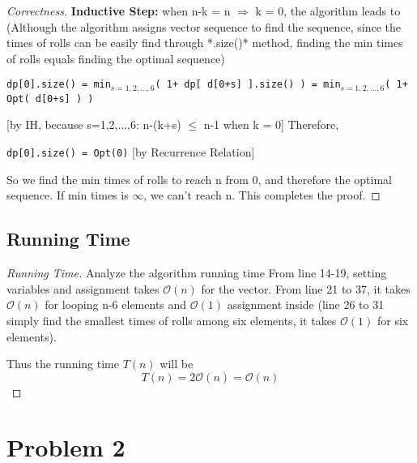 \documentclass[openany]{article}
\begin{document}
\begin{proof}[Correctness]{}
    \textbf{Inductive Step:} when n-k = n $\Rightarrow$ k = 0, the algorithm leads to (Although the algorithm assigns vector sequence to find the sequence, since the times of rolls can be easily find through *.size()* method, finding the min times of rolls equals finding the optimal sequence)
    \begin{center}
        \texttt{dp[0].size() = min$_{s=1,2,...,6}$( 1+ dp[ d[0+s] ].size() ) = min$_{s=1,2,...,6}$( 1+ Opt( d[0+s] ) )}
    \end{center}
    [by IH, because s=1,2,...,6: n-(k+s) $\leq$ n-1 when k = 0]
    Therefore,
    \begin{center}
        \texttt{dp[0].size() = Opt(0)} [by Recurrence Relation]
    \end{center}
    
    So we find the min times of rolls to reach n from 0, and therefore the optimal sequence. If min times is $\infty$, we can't reach n. This completes the proof.

\end{proof}

\subsection*{Running Time}
\begin{proof}[Running Time]{Analyze the algorithm running time}
    	\renewcommand{\qedsymbol}{}
    	From line 14-19, setting variables and assignment takes $\mathcal{O}(n)$ for the vector. From line 21 to 37, it takes $\mathcal{O}(n)$ for looping n-6 elements and $\mathcal{O}(1)$ assignment inside (line 26 to 31 simply find the smallest times of rolls among six elements, it takes $\mathcal{O}(1)$ for six elements).
    	
    	Thus the running time $T(n)$ will be \[T(n)=2\mathcal{O}(n)=\mathcal{O}(n)\]
\end{proof}

\section*{Problem 2}





\end{document}
